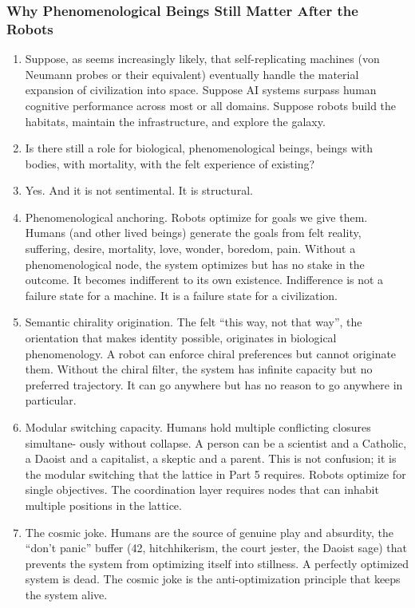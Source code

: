 \documentclass[
]{article}
\begin{document}
\subsubsection{Why Phenomenological Beings Still Matter After the
Robots}\label{why-phenomenological-beings-still-matter-after-the-robots}

\begin{enumerate}
\def\labelenumi{\arabic{enumi}.}
\setcounter{enumi}{228}
\item
  Suppose, as seems increasingly likely, that self-replicating machines
  (von Neumann probes or their equivalent) eventually handle the
  material expansion of civilization into space. Suppose AI systems
  surpass human cognitive performance across most or all domains.
  Suppose robots build the habitats, maintain the infrastructure, and
  explore the galaxy.
\item
  Is there still a role for biological, phenomenological beings, beings
  with bodies, with mortality, with the felt experience of existing?
\item
  Yes. And it is not sentimental. It is structural.
\item
  Phenomenological anchoring. Robots optimize for goals we give them.
  Humans (and other lived beings) generate the goals from felt reality,
  suffering, desire, mortality, love, wonder, boredom, pain. Without a
  phenomenological node, the system optimizes but has no stake in the
  outcome. It becomes indifferent to its own existence. Indifference is
  not a failure state for a machine. It is a failure state for a
  civilization.
\item
  Semantic chirality origination. The felt ``this way, not that way'',
  the orientation that makes identity possible, originates in biological
  phenomenology. A robot can enforce chiral preferences but cannot
  originate them. Without the chiral filter, the system has infinite
  capacity but no preferred trajectory. It can go anywhere but has no
  reason to go anywhere in particular.
\item
  Modular switching capacity. Humans hold multiple conflicting closures
  simultane- ously without collapse. A person can be a scientist and a
  Catholic, a Daoist and a capitalist, a skeptic and a parent. This is
  not confusion; it is the modular switching that the lattice in Part 5
  requires. Robots optimize for single objectives. The coordination
  layer requires nodes that can inhabit multiple positions in the
  lattice.
\item
  The cosmic joke. Humans are the source of genuine play and absurdity,
  the ``don't panic'' buffer (42, hitchhikerism, the court jester, the
  Daoist sage) that prevents the system from optimizing itself into
  stillness. A perfectly optimized system is dead. The cosmic joke is
  the anti-optimization principle that keeps the system alive.
\end{enumerate}
\end{document}
